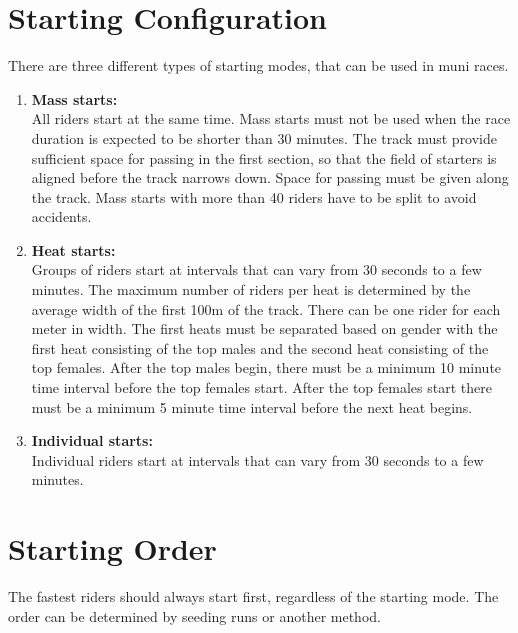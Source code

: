 \section{Starting Configuration}

There are three different types of starting modes, that can be used in muni races.
\begin{enumerate}
\item \textbf{Mass starts:}\\
All riders start at the same time.
Mass starts must not be used when the race duration is expected to be shorter than 30 minutes.
The track must provide sufficient space for passing in the first section, so that the field of starters is aligned before the track narrows down.
Space for passing must be given along the track.
Mass starts with more than 40 riders have to be split to avoid accidents.
\item \textbf{Heat starts:}\\
Groups of riders start at intervals that can vary from 30 seconds to a few minutes.
The maximum number of riders per heat is determined by the average width of the first 100m of the track.
There can be one rider for each meter in width.
The first heats must be separated based on gender with the first heat consisting of the top males and the second heat consisting of the top females.
After the top males begin, there must be a minimum 10 minute time interval before the top females start.
After the top females start there must be a minimum 5 minute time interval before the next heat begins.
\item \textbf{Individual starts:}\\
Individual riders start at intervals that can vary from 30 seconds to a few minutes.
\end{enumerate}

\section{Starting Order}

The fastest riders should always start first, regardless of the starting mode.
The order can be determined by seeding runs or another method.
